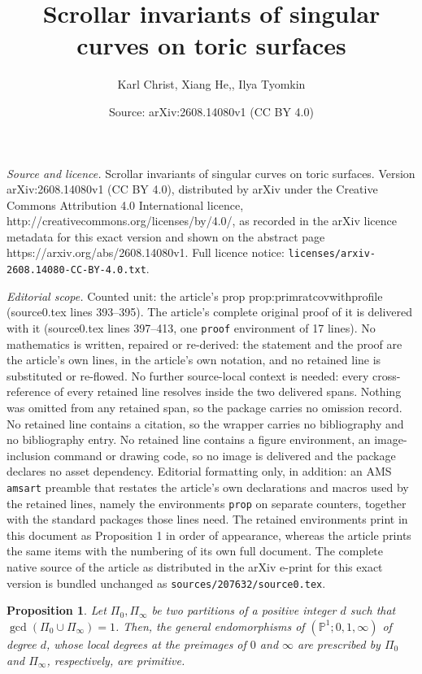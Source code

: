 \documentclass[10pt,a4paper]{amsart}
\title{Scrollar invariants of singular curves on toric surfaces}
\author{Karl Christ, Xiang He,, Ilya Tyomkin}
\date{Source: arXiv:2608.14080v1 (CC BY 4.0)}
\newtheorem{prop}{Proposition}
\newcommand{\PP}{{\mathbb P}}
\begin{document}
\maketitle

\noindent\emph{Source and licence.} Scrollar invariants of singular curves on toric surfaces. Version arXiv:2608.14080v1 (CC BY 4.0), distributed by arXiv under the Creative Commons Attribution 4.0 International licence, http://creativecommons.org/licenses/by/4.0/, as recorded in the arXiv licence metadata for this exact version and shown on the abstract page https://arxiv.org/abs/2608.14080v1. Full licence notice: \texttt{licenses/arxiv-2608.14080-CC-BY-4.0.txt}.\par\smallskip

\noindent\textit{Editorial scope.} Counted unit: the article's prop prop:primratcovwithprofile (source0.tex lines 393--395). The article's complete original proof of it is delivered with it (source0.tex lines 397--413, one \texttt{proof} environment of 17 lines). No mathematics is written, repaired or re-derived: the statement and the proof are the article's own lines, in the article's own notation, and no retained line is substituted or re-flowed.  No further source-local context is needed: every cross-reference of every retained line resolves inside the two delivered spans.  Nothing was omitted from any retained span, so the package carries no omission record.  No retained line contains a citation, so the wrapper carries no bibliography and no bibliography entry.  No retained line contains a figure environment, an image-inclusion command or drawing code, so no image is delivered and the package declares no asset dependency.  Editorial formatting only, in addition: an AMS \texttt{amsart} preamble that restates the article's own declarations and macros used by the retained lines, namely the environments \texttt{prop} on separate counters, together with the standard packages those lines need.  The retained environments print in this document as Proposition 1 in order of appearance, whereas the article prints the same items with the numbering of its own full document.  The complete native source of the article as distributed in the arXiv e-print for this exact version is bundled unchanged as \texttt{sources/207632/source0.tex}.
\begin{prop}\label{prop:primratcovwithprofile}
    Let $\Pi_0, \Pi_\infty$ be two partitions of a positive integer $d$ such that \mbox{$\gcd(\Pi_0\cup \Pi_\infty)=1$}. Then, the general endomorphisms of $(\PP^1;0,1,\infty)$ of degree $d$, whose local degrees at the preimages of $0$ and $\infty$ are prescribed by $\Pi_0$ and $\Pi_\infty$, respectively, are primitive. 
\end{prop}
\end{document}
